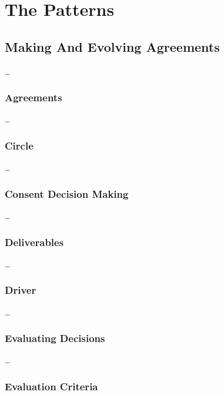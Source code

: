 \part{The Patterns}
\label{thepatterns}

\chapter{Making And Evolving Agreements}
\label{makingandevolvingagreements}

{\ldots}

\section{Agreements}
\label{agreements}

{\ldots}

\section{Circle}
\label{circle}

{\ldots}

\section{Consent Decision Making}
\label{consentdecisionmaking}

{\ldots}

\section{Deliverables}
\label{deliverables}

{\ldots}

\section{Driver}
\label{driver}

{\ldots}

\section{Evaluating Decisions}
\label{evaluatingdecisions}

{\ldots}

\section{Evaluation Criteria}
\label{evaluationcriteria}

